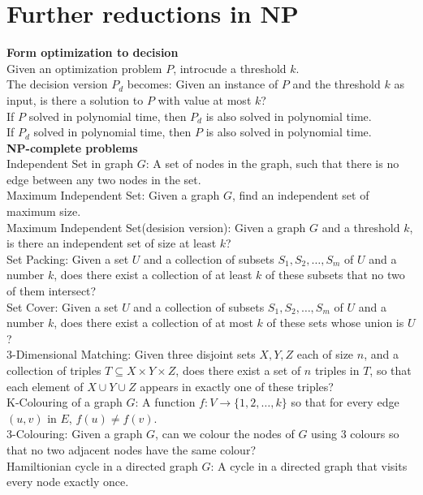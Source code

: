 \documentclass[onecolumn]{report}
\begin{document}
\section{Further reductions in NP}
\textbf{Form optimization to decision}\\
Given an optimization problem $P$, introcude a threshold $k$.\\
The decision version $P_d$ becomes: Given an instance of $P$ and the threshold $k$ as input, is there a solution to $P$ with value at most $k$?\\
\indent If $P$ solved in polynomial time, then $P_d$ is also solved in polynomial time.\\
\indent If $P_d$ solved in polynomial time, then $P$ is also solved in polynomial time.\\
\noindent
\textbf{NP-complete problems}\\
Independent Set in graph $G$: A set of nodes in the graph, such that there is no edge between any two nodes in the set.\\
Maximum Independent Set: Given a graph $G$, find an independent set of maximum size.\\
Maximum Independent Set(desision version): Given a graph $G$ and a threshold $k$, is there an independent set of size at least $k$?\\
Set Packing: Given a set $U$ and a collection of subsets $S_1, S_2, \dots, S_m$ of $U$ and a number $k$, does there exist a collection of at least $k$ of these subsets that no two of them intersect?\\
Set Cover: Given a set $U$ and a collection of subsets $S_1, S_2, \dots, S_m$ of $U$ and a number $k$, does there exist a collection of at most $k$ of these sets whose union is $U$?\\
3-Dimensional Matching: Given three disjoint sets $X, Y, Z$ each of size $n$, and a collection of triples $T \subseteq X \times Y \times Z$, does there exist a set of $n$ triples in $T$, so that each element of $X \cup Y \cup Z$ appears in exactly one of these triples?\\
K-Colouring of a graph $G$: A function $f: V \rightarrow \{1, 2, \dots, k\}$ so that for every edge $(u, v)$ in $E$, $f(u) \neq f(v)$.\\
3-Colouring: Given a graph $G$, can we colour the nodes of $G$ using 3 colours so that no two adjacent nodes have the same colour?\\
Hamiltionian cycle in a directed graph $G$: A cycle in a directed graph that visits every node exactly once.\\
\end{document}

